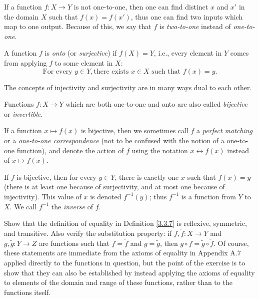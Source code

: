 \setcounter{theorem}{15}
\begin{remark}\label{3.3.16}
If a function \(f : X \to Y\) is not one-to-one, then one can find distinct \(x\) and \(x'\) in the domain \(X\) such that \(f(x) = f(x')\), thus one can find two inputs which map to one output.
Because of this, we say that \(f\) is \emph{two-to-one} instead of \emph{one-to-one}.
\end{remark}

\begin{definition}\label{3.3.17}
A function \(f\) is \emph{onto} (or \emph{surjective}) if \(f(X) = Y\), i.e., every element in \(Y\) comes from applying \(f\) to some element in \(X\):
\[
    \text{For every } y \in Y, \text{there exists } x \in X \text{ such that } f(x) = y.
\]
\end{definition}

\setcounter{theorem}{18}
\begin{remark}\label{3.3.19}
The concepts of injectivity and surjectivity are in many ways dual to each other.
\end{remark}

\begin{definition}\label{3.3.20}
Functions \(f : X \to Y\) which are both one-to-one and onto are also called \emph{bijective} or \emph{invertible}.
\end{definition}

\setcounter{theorem}{22}
\begin{remark}\label{3.3.23}
If a function \(x \mapsto f(x)\) is bijective, then we sometimes call \(f\) a \emph{perfect matching} or a \emph{one-to-one correspondence} (not to be confused with the notion of a one-to-one function), and denote the action of \(f\) using the notation \(x \leftrightarrow f(x)\) instead of \(x \mapsto f(x)\).
\end{remark}

\begin{note}
If \(f\) is bijective, then for every \(y \in Y\), there is exactly one \(x\) such that \(f(x) = y\) (there is at least one because of surjectivity, and at most one because of injectivity).
This value of \(x\) is denoted \(f^{-1}(y)\); thus \(f^{-1}\) is a function from \(Y\) to \(X\).
We call \(f^{-1}\) the \emph{inverse} of \(f\).
\end{note}

\exercisesection

\begin{exercise}\label{ex 3.3.1}
Show that the definition of equality in Definition \ref{3.3.7} is reflexive, symmetric, and transitive.
Also verify the substitution property: if \(f, \tilde{f} : X \to Y\) and \(g, \tilde{g} : Y \to Z\) are functions such that \(f = \tilde{f}\) and \(g = \tilde{g}\), then \(g \circ f = \tilde{g} \circ \tilde{f}\).
Of course, these statements are immediate from the axioms of equality in Appendix A.7 applied directly to the functions in question, but the point of the exercise is to show that they can also be established by instead applying the axioms of equality to elements of the domain and range of these functions, rather than to the functions itself.
\end{exercise}

